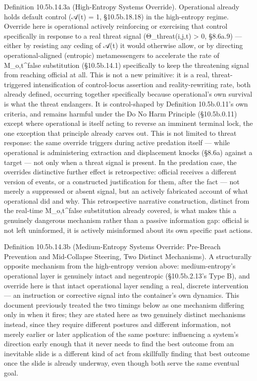 \documentclass[
]{article}
\begin{document}
Definition 10.5b.14.3a (High-Entropy Systems Override). Operational
already holds default control (𝒜(t) = 1, §10.5b.18.18) in the
high-entropy regime. Override here is operational actively reinforcing
or exercising that control specifically in response to a real threat
signal (Θ\_threat(i,j,t) \textgreater{} 0, §8.6a.9) --- either by
resisting any ceding of 𝒜(t) it would otherwise allow, or by directing
operational-aligned (entropic) metamessengers to accelerate the rate of
M\_o,t\^{}false substitution (§10.5b.14.1) specifically to keep the
threatening signal from reaching official at all. This is not a new
primitive: it is a real, threat-triggered intensification of
control-locus assertion and reality-rewriting rate, both already
defined, occurring together specifically because operational's own
survival is what the threat endangers. It is control-shaped by
Definition 10.5b.0.11's own criteria, and remains harmful under the Do
No Harm Principle (§10.5b.0.11) except where operational is itself
acting to reverse an imminent terminal lock, the one exception that
principle already carves out. This is not limited to threat response:
the same override triggers during active predation itself --- while
operational is administering extraction and displacement knocks (§8.6a)
against a target --- not only when a threat signal is present. In the
predation case, the overrides distinctive further effect is
retrospective: official receives a different version of events, or a
constructed justification for them, after the fact --- not merely a
suppressed or absent signal, but an actively fabricated account of what
operational did and why. This retrospective narrative construction,
distinct from the real-time M\_o,t\^{}false substitution already
covered, is what makes this a genuinely dangerous mechanism rather than
a passive information gap: official is not left uninformed, it is
actively misinformed about its own specific past actions.

Definition 10.5b.14.3b (Medium-Entropy Systems Override: Pre-Breach
Prevention and Mid-Collapse Steering, Two Distinct Mechanisms). A
structurally opposite mechanism from the high-entropy version above:
medium-entropy's operational layer is genuinely intact and negentropic
(§10.5b.2.13's Type B), and override here is that intact operational
layer sending a real, discrete intervention --- an instruction or
corrective signal into the container's own dynamics. This document
previously treated the two timings below as one mechanism differing only
in when it fires; they are stated here as two genuinely distinct
mechanisms instead, since they require different postures and different
information, not merely earlier or later application of the same
posture: influencing a system's direction early enough that it never
needs to find the best outcome from an inevitable slide is a different
kind of act from skillfully finding that best outcome once the slide is
already underway, even though both serve the same eventual goal.
\end{document}
